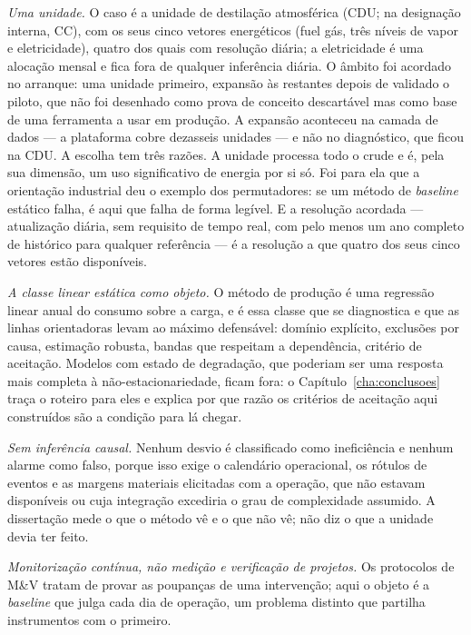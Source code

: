 \emph{Uma unidade.} O caso é a unidade de destilação atmosférica (CDU;
na designação interna, CC), com os seus cinco vetores energéticos (fuel
gás, três níveis de vapor e eletricidade), quatro dos quais com
resolução diária; a eletricidade é uma alocação mensal e fica fora de
qualquer inferência diária. O âmbito foi acordado no arranque: uma
unidade primeiro, expansão às restantes depois de validado o piloto, que
não foi desenhado como prova de conceito descartável mas como base de
uma ferramenta a usar em produção. A expansão aconteceu na camada de
dados --- a plataforma cobre dezasseis unidades --- e não no diagnóstico,
que ficou na CDU. A escolha tem três razões. A unidade processa todo o
crude e é, pela sua dimensão, um uso significativo de energia por si
só. Foi para ela que a orientação industrial deu o exemplo dos
permutadores: se um método de \emph{baseline} estático falha, é aqui que
falha de forma legível. E a resolução acordada --- atualização diária,
sem requisito de tempo real, com pelo menos um ano completo de histórico
para qualquer referência --- é a resolução a que quatro dos seus cinco
vetores estão disponíveis.

\emph{A classe linear estática como objeto.} O método de produção é uma
regressão linear anual do consumo sobre a carga, e é essa classe que se
diagnostica e que as linhas orientadoras levam ao máximo defensável:
domínio explícito, exclusões por causa, estimação robusta, bandas que
respeitam a dependência, critério de aceitação. Modelos com estado de
degradação, que poderiam ser uma resposta mais completa à não-estacionariedade,
ficam fora: o Capítulo~\ref{cha:conclusoes} traça o roteiro para eles e
explica por que razão os critérios de aceitação aqui construídos são a
condição para lá chegar.

\emph{Sem inferência causal.} Nenhum desvio é classificado como
ineficiência e nenhum alarme como falso, porque isso exige o calendário
operacional, os rótulos de eventos e as margens materiais elicitadas
com a operação, que não estavam disponíveis ou cuja integração excediria o grau de complexidade assumido. A dissertação mede o que o
método vê e o que não vê; não diz o que a unidade devia ter feito.

\emph{Monitorização contínua, não medição e verificação de projetos.}
Os protocolos de M\&V tratam de provar as poupanças de uma intervenção;
aqui o objeto é a \emph{baseline} que julga cada dia de operação, um
problema distinto que partilha instrumentos com o primeiro.

